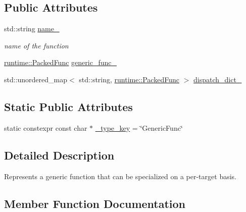 \subsection*{Public Attributes}
\begin{DoxyCompactItemize}
\item 
std\+::string \hyperlink{classtvm_1_1GenericFuncNode_ade1da360d3e314360fd5399b2d76d3a1}{name\+\_\+}
\begin{DoxyCompactList}\small\item\em name of the function \end{DoxyCompactList}\item 
\hyperlink{classtvm_1_1runtime_1_1PackedFunc}{runtime\+::\+Packed\+Func} \hyperlink{classtvm_1_1GenericFuncNode_acaf4bdfb07ba37809feb52ec863ec4d3}{generic\+\_\+func\+\_\+}
\item 
std\+::unordered\+\_\+map$<$ std\+::string, \hyperlink{classtvm_1_1runtime_1_1PackedFunc}{runtime\+::\+Packed\+Func} $>$ \hyperlink{classtvm_1_1GenericFuncNode_af9c722adc3fc97ade2c64c7e140462ea}{dispatch\+\_\+dict\+\_\+}
\end{DoxyCompactItemize}
\subsection*{Static Public Attributes}
\begin{DoxyCompactItemize}
\item 
static constexpr const char $\ast$ \hyperlink{classtvm_1_1GenericFuncNode_a32b96460a03360f3c6857047ba252797}{\+\_\+type\+\_\+key} = \char`\"{}Generic\+Func\char`\"{}
\end{DoxyCompactItemize}


\subsection{Detailed Description}
Represents a generic function that can be specialized on a per-\/target basis. 

\subsection{Member Function Documentation}
